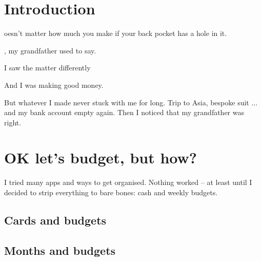 \documentclass[a5paper,10pt]{book}
\begin{document}
\section{Introduction}
\date
Doesn't matter how much you make if your back pocket has a hole in it.

, my grandfather used to say.

I saw the matter differently 

And I was making good money.

But whatever I made never stuck with me for long. Trip to Asia, bespoke suit ... and my bank account empty again. Then I noticed that my grandfather was right.

\section{OK let's budget, but how?}

I tried many apps and ways to get organised. Nothing worked – at least until I decided to strip everything to bare bones: cash and weekly budgets.

\subsection{Cards and budgets}
\subsection{Months and budgets}
\end{document}
